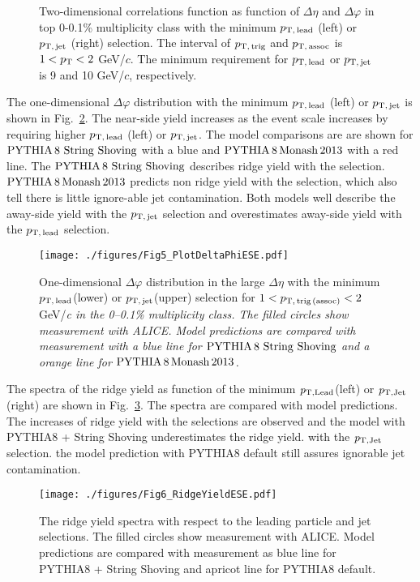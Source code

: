 \begin{figure}[h!]
	\centering
	\caption{ Two-dimensional correlations function as function of $\Delta\eta$ and $\Delta\varphi$ in top 0-0.1\% multiplicity class with the minimum $p_\mathrm{T,\,lead}$ (left) or $p_\mathrm{T,\,jet}$ (right) selection. The interval of $p_\mathrm{T,\,trig}$ and $p_\mathrm{T,\,assoc}$ is $1<p_\mathrm{T}<2$ GeV/$c$. The minimum requirement for $p_\mathrm{T,\,lead}$ or $p_\mathrm{T,\,jet}$ is 9 and 10 GeV/$c$, respectively. }
	\label{fig:PlotCorrHMTSel}
\end{figure}

The one-dimensional $\Delta\varphi$ distribution with the minimum $p_\mathrm{T,\,lead}$ (left) or $p_\mathrm{T,\,jet}$ is shown in Fig.~\ref{fig:PlotDeltaPhiESE}. The near-side yield increases as the event scale increases by requiring higher $p_\mathrm{T,\,lead}$ (left) or $p_\mathrm{T,\,jet}$. The model comparisons are are shown for $\mathrm{PYTHIA}\,8~\mathrm{String}~\mathrm{Shoving}$ with a blue and $\mathrm{PYTHIA}\,8\,\mathrm{Monash}\,2013$ with a red line. The $\mathrm{PYTHIA}\,8~\mathrm{String}~\mathrm{Shoving}$ describes ridge yield with the selection. $\mathrm{PYTHIA}\,8\,\mathrm{Monash}\,2013$ predicts non ridge yield with the selection, which also tell there is little ignore-able jet contamination. Both models well describe the away-side yield with the $p_\mathrm{T,\,jet}$ selection and overestimates away-side yield with the $p_\mathrm{T,\,lead}$ selection.

\begin{figure}[h!]
	\centering
	\texttt{[image: ./figures/Fig5\_PlotDeltaPhiESE.pdf]}
	\caption{ One-dimensional $\Delta\varphi$ distribution in the large $\Delta\eta$ with the minimum $p_\mathrm{T,\,lead}$(lower) or $p_\mathrm{T,\,jet}$(upper) selection for $1<p_\mathrm{T,\,trig\,(assoc)}<2$ GeV/\it{c}\rm{} in the 0--0.1\% multiplicity class. The filled circles show measurement with ALICE. Model predictions are compared with measurement with a blue line for $\mathrm{PYTHIA}\,8~\mathrm{String}~\mathrm{Shoving}$  and a orange line for $\mathrm{PYTHIA}\,8\,\mathrm{Monash}\,2013$.}
	\label{fig:PlotDeltaPhiESE}
\end{figure}

The spectra of the ridge yield as function of the minimum $\it{p}_{\rm{T, Lead}}$(left) or $\it{p}_{\rm{T, Jet}}$(right) are shown in Fig.~\ref{fig:RidgeYield_ESE}. The spectra are compared with model predictions. 
The increases of ridge yield with the selections are observed and the model with PYTHIA8 + String Shoving underestimates the ridge yield. with the $\it{p}_{\rm{T, Jet}}$ selection. the model prediction with PYTHIA8 default still assures ignorable jet contamination.

\begin{figure}[h!]
	\centering
	\texttt{[image: ./figures/Fig6\_RidgeYieldESE.pdf]}
	\caption{The ridge yield spectra with respect to the leading particle and jet selections. The filled circles show measurement with ALICE. Model predictions are compared with measurement as blue line for PYTHIA8 + String Shoving  and apricot line for PYTHIA8 default.}
	\label{fig:RidgeYield_ESE}
\end{figure}



